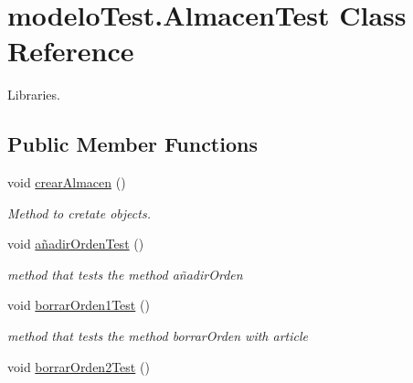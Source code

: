 \hypertarget{classmodelo_test_1_1_almacen_test}{}\section{modelo\+Test.\+Almacen\+Test Class Reference}
\label{classmodelo_test_1_1_almacen_test}


Libraries.  


\subsection*{Public Member Functions}
\begin{DoxyCompactItemize}
\item 
\mbox{\label{classmodelo_test_1_1_almacen_test_a6168f6d28be3c0e968cc7c03229e039d}} 
void \mbox{\hyperlink{classmodelo_test_1_1_almacen_test_a6168f6d28be3c0e968cc7c03229e039d}{crear\+Almacen}} ()
\begin{DoxyCompactList}\small\item\em Method to cretate objects. \end{DoxyCompactList}\item 
\mbox{\label{classmodelo_test_1_1_almacen_test_a0ad03551d975d93091682b6a66a5ca30}} 
void \mbox{\hyperlink{classmodelo_test_1_1_almacen_test_a0ad03551d975d93091682b6a66a5ca30}{añadir\+Orden\+Test}} ()
\begin{DoxyCompactList}\small\item\em method that tests the method añadir\+Orden \end{DoxyCompactList}\item 
\mbox{\label{classmodelo_test_1_1_almacen_test_a734f5c2b60a8edf3c072caf0a33c776e}} 
void \mbox{\hyperlink{classmodelo_test_1_1_almacen_test_a734f5c2b60a8edf3c072caf0a33c776e}{borrar\+Orden1\+Test}} ()
\begin{DoxyCompactList}\small\item\em method that tests the method borrar\+Orden with article \end{DoxyCompactList}\item 
\mbox{\label{classmodelo_test_1_1_almacen_test_a23dfff53896d8ae9fe0403a75911b323}} 
void \mbox{\hyperlink{classmodelo_test_1_1_almacen_test_a23dfff53896d8ae9fe0403a75911b323}{borrar\+Orden2\+Test}} ()

\end{DoxyCompactItemize}
